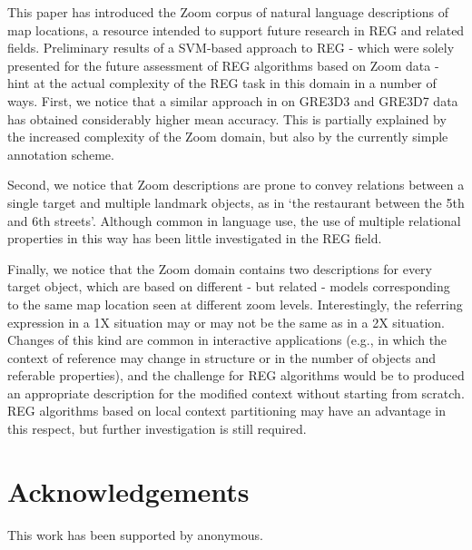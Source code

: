 \documentclass[11pt]{article}
\begin{document}
This paper has introduced the Zoom corpus of natural language descriptions of map locations, a resource intended to support future research in REG and related fields. Preliminary results of a SVM-based approach to REG - which were solely presented for the future assessment of REG algorithms based on Zoom data - hint at the actual complexity of the REG task in this domain in a number of ways. First, we notice that a similar approach in \cite{thiago-svm} on GRE3D3 and GRE3D7 data has obtained considerably higher mean accuracy. This is partially explained by the increased complexity of the Zoom domain, but also by the currently  simple annotation scheme.

Second, we notice that Zoom descriptions are prone to convey relations between a single target and multiple landmark objects, as in `the restaurant between the 5th and 6th streets'. Although common in language use, the use of multiple relational properties in this way has been little investigated in the REG field. 

Finally, we notice that the Zoom domain contains two descriptions for every target object, which are based on different - but related - models corresponding to the same map location seen at different zoom levels. Interestingly, the referring expression in a 1X situation may or may not be the same as in a 2X situation. Changes of this kind are common in interactive applications (e.g., in which the context of reference may change in structure or in the number of objects and referable properties), and the challenge for REG algorithms would be to produced an appropriate description for the modified context without starting from scratch. REG algorithms based on local context partitioning \cite{areces08} may have an advantage in this respect, but further investigation is still required.


\section*{Acknowledgements}
This work has been supported by anonymous. 

\clearpage


\end{document}
